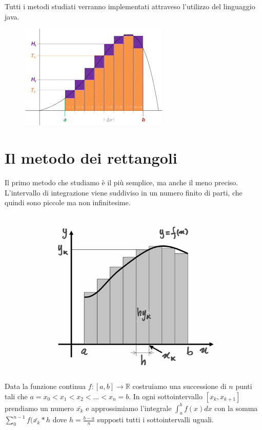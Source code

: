 \documentclass{article}
\begin{document}
Tutti i metodi studiati verranno implementati attraveso l'utilizzo del linguaggio java.

\begin{center}
\begin{figure}[ht]

\includegraphics[scale=1]{img/rieman.png} 
\label{fig:rieman}
\end{figure}

\end{center}

\newpage
\section{Il metodo dei rettangoli}
Il primo metodo che studiamo è il più semplice, ma anche il meno preciso. L’intervallo di integrazione viene suddiviso in un numero finito di parti, che quindi sono piccole ma non infinitesime.
\begin{figure}[ht]
\centering
\includegraphics[scale=0.25]{img/09_01_int_rettangoli.png} 
\label{fig:rect}
\end{figure}

Data la funzione continua $f:[a,b]\rightarrow \mathbb{R}$ costruiamo una successione di $n$ punti tali che $a=x_0<x_1<x_2<...<x_n=b$.
In ogni sottointervallo $[x_k,x_{k+1}]$ prendiamo un numero $\bar{x_k}$ e approssimiamo l'integrale $\int_{a}^{b}f(x)dx$ con la somma $\sum_{0}^{n-1}f(\bar{x_k}*h$ dove $h = \frac{b-a}{n}$ supposti tutti i sottointervalli uguali.
\end{document}
